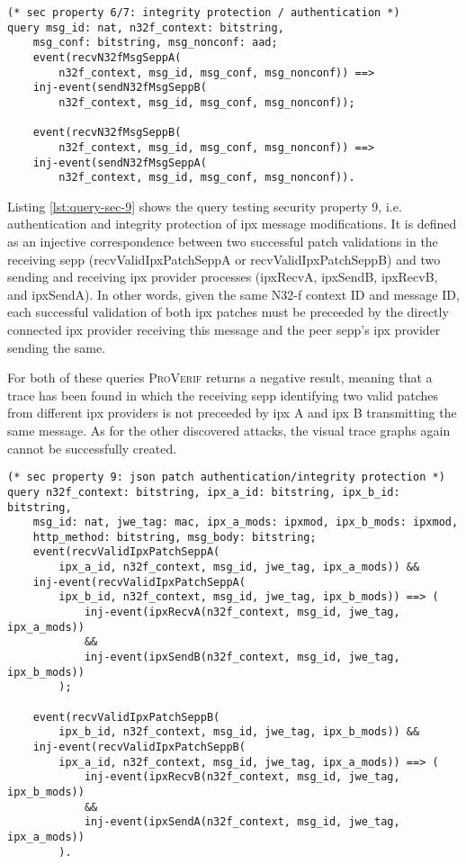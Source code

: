 \begin{lstlisting}[caption={Query for security property 6 and 7},label={lst:query-sec-6},firstnumber=416]
(* sec property 6/7: integrity protection / authentication *)
query msg_id: nat, n32f_context: bitstring,
    msg_conf: bitstring, msg_nonconf: aad;
    event(recvN32fMsgSeppA(
        n32f_context, msg_id, msg_conf, msg_nonconf)) ==>
    inj-event(sendN32fMsgSeppB(
        n32f_context, msg_id, msg_conf, msg_nonconf));

    event(recvN32fMsgSeppB(
        n32f_context, msg_id, msg_conf, msg_nonconf)) ==>
    inj-event(sendN32fMsgSeppA(
        n32f_context, msg_id, msg_conf, msg_nonconf)).
\end{lstlisting}

Listing \ref{lst:query-sec-9} shows the query testing security property 9, i.e. authentication and integrity protection of \gls{ipx} message modifications.
It is defined as an injective correspondence between two successful patch validations in the receiving \gls{sepp} ({\sffamily recvValidIpxPatchSeppA} or {\sffamily recvValidIpxPatchSeppB}) and two sending and receiving \gls{ipx} provider processes ({\sffamily ipxRecvA}, {\sffamily ipxSendB}, {\sffamily ipxRecvB}, and {\sffamily ipxSendA}).
In other words, given the same N32-f context ID and message ID, each successful validation of both \gls{ipx} patches must be preceeded by the directly connected \gls{ipx} provider receiving this message and the peer \gls{sepp}'s \gls{ipx} provider sending the same.

For both of these queries \textsc{ProVerif} returns a negative result, meaning that a trace has been found in which the receiving \gls{sepp} identifying two valid patches from different \gls{ipx} providers is not preceeded by \gls{ipx} A and \gls{ipx} B transmitting the same message.
As for the other discovered attacks, the visual trace graphs again cannot be successfully created.

\begin{lstlisting}[caption={Query for security property 9},label={lst:query-sec-9},firstnumber=394]
(* sec property 9: json patch authentication/integrity protection *)
query n32f_context: bitstring, ipx_a_id: bitstring, ipx_b_id: bitstring,
    msg_id: nat, jwe_tag: mac, ipx_a_mods: ipxmod, ipx_b_mods: ipxmod,
    http_method: bitstring, msg_body: bitstring;
    event(recvValidIpxPatchSeppA(
        ipx_a_id, n32f_context, msg_id, jwe_tag, ipx_a_mods)) &&
    inj-event(recvValidIpxPatchSeppA(
        ipx_b_id, n32f_context, msg_id, jwe_tag, ipx_b_mods)) ==> (
            inj-event(ipxRecvA(n32f_context, msg_id, jwe_tag, ipx_a_mods))
            &&
            inj-event(ipxSendB(n32f_context, msg_id, jwe_tag, ipx_b_mods))
        );

    event(recvValidIpxPatchSeppB(
        ipx_b_id, n32f_context, msg_id, jwe_tag, ipx_b_mods)) &&
    inj-event(recvValidIpxPatchSeppB(
        ipx_a_id, n32f_context, msg_id, jwe_tag, ipx_a_mods)) ==> (
            inj-event(ipxRecvB(n32f_context, msg_id, jwe_tag, ipx_b_mods))
            &&
            inj-event(ipxSendA(n32f_context, msg_id, jwe_tag, ipx_a_mods))
        ).
\end{lstlisting}


